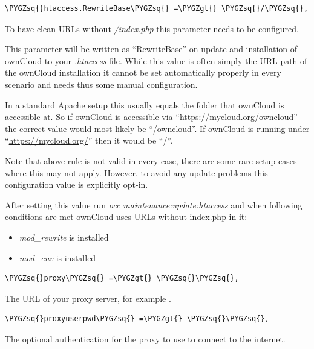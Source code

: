 \documentclass[letterpaper,10pt,english]{sphinxmanual}
\def\PYGZgt{\char`\>}
\def\PYGZsq{\char`\'}
\begin{document}
\begin{Verbatim}[commandchars=\\\{\}]
\PYGZsq{}htaccess.RewriteBase\PYGZsq{} =\PYGZgt{} \PYGZsq{}/\PYGZsq{},
\end{Verbatim}

To have clean URLs without \emph{/index.php} this parameter needs to be configured.

This parameter will be written as ``RewriteBase'' on update and installation of
ownCloud to your \emph{.htaccess} file. While this value is often simply the URL
path of the ownCloud installation it cannot be set automatically properly in
every scenario and needs thus some manual configuration.

In a standard Apache setup this usually equals the folder that ownCloud is
accessible at. So if ownCloud is accessible via ``\href{https://mycloud.org/owncloud}{https://mycloud.org/owncloud}''
the correct value would most likely be ``/owncloud''. If ownCloud is running
under ``\href{https://mycloud.org/}{https://mycloud.org/}'' then it would be ``/''.

Note that above rule is not valid in every case, there are some rare setup
cases where this may not apply. However, to avoid any update problems this
configuration value is explicitly opt-in.

After setting this value run \emph{occ maintenance:update:htaccess} and when following
conditions are met ownCloud uses URLs without index.php in it:
\begin{itemize}
\item {} 
\emph{mod\_rewrite} is installed

\item {} 
\emph{mod\_env} is installed

\end{itemize}

\begin{Verbatim}[commandchars=\\\{\}]
\PYGZsq{}proxy\PYGZsq{} =\PYGZgt{} \PYGZsq{}\PYGZsq{},
\end{Verbatim}

The URL of your proxy server, for example .

\begin{Verbatim}[commandchars=\\\{\}]
\PYGZsq{}proxyuserpwd\PYGZsq{} =\PYGZgt{} \PYGZsq{}\PYGZsq{},
\end{Verbatim}

The optional authentication for the proxy to use to connect to the internet.
\end{document}
